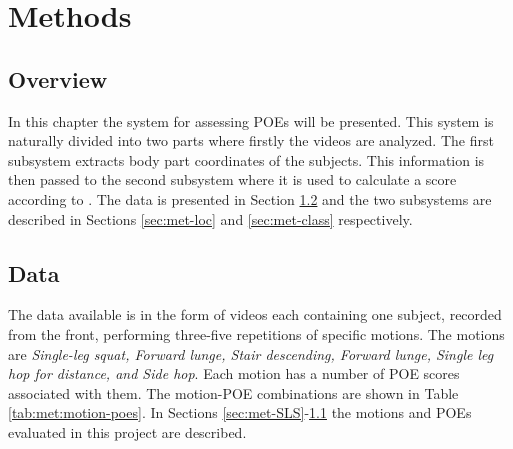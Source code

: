 \chapter{Methods}
\section{Overview}
In this chapter the system for assessing POEs will be presented. This system is naturally divided into two parts where firstly the videos are analyzed. The first subsystem extracts body part coordinates of the subjects. This information is then passed to the second subsystem where it is used to calculate a score according to \cite{Nae2017}. The data is presented in Section \ref{sec:met-data} and the two subsystems are described in Sections \ref{sec:met-loc} and \ref{sec:met-class} respectively.

\section{Data}\label{sec:met-data}
The data available is in the form of videos each containing one subject, recorded from the front, performing three-five repetitions of specific motions. The motions are \textit{Single-leg squat, Forward lunge, Stair descending, Forward lunge, Single leg hop for distance, and Side hop}. Each motion has a number of POE scores associated with them. The motion-POE combinations are shown in Table \ref{tab:met:motion-poes}. In Sections \ref{sec:met-SLS}-\ref{} the motions and POEs evaluated in this project are described.

%



